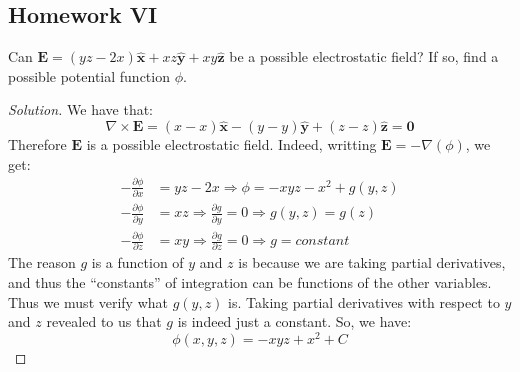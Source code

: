         \subsection{Homework VI}
            \begin{problem}[Wangsness 5-1]
                Can
                $\mathbf{E}%
                 =(yz-2x)\hat{\mathbf{x}}%
                 +xz\hat{\mathbf{y}}%
                 +xy\hat{\mathbf{z}}$
                be a possible electrostatic field? If so,
                find a possible potential function $\phi$.
            \end{problem}
            \begin{proof}[Solution]
                We have that:
                \begin{equation*}
                    \nabla\times\mathbf{E}
                    =(x-x)\hat{\mathbf{x}}
                    -(y-y)\hat{\mathbf{y}}
                    +(z-z)\hat{\mathbf{z}}
                    =\mathbf{0}    
                \end{equation*}
                Therefore $\mathbf{E}$ is a possible electrostatic field.
                Indeed, writting $\mathbf{E}=-\nabla(\phi)$, we get:
                \begin{align*}
                    -\frac{\partial\phi}{\partial{x}}
                    &=yz-2x
                    \Rightarrow\phi=-xyz-x^{2}+g(y,z)\\
                    -\frac{\partial\phi}{\partial{y}}
                    &=xz
                    \Rightarrow\frac{\partial{g}}{\partial{y}}=0
                    \Rightarrow{g(y,z)=g(z)}\\
                    -\frac{\partial\phi}{\partial{z}}
                    &=xy
                    \Rightarrow\frac{\partial{g}}{\partial{z}}=0
                    \Rightarrow{g=constant}
                \end{align*}
                The reason $g$ is a function of $y$ and $z$ is because
                we are taking partial derivatives, and thus the
                ``constants'' of integration can be functions of
                the other variables. Thus we must verify what $g(y,z)$
                is. Taking partial derivatives with respect to
                $y$ and $z$ revealed to us that $g$ is indeed just
                a constant. So, we have:
                \begin{equation*}
                    \phi(x,y,z)=-xyz+x^{2}+C    
                \end{equation*}

\end{proof}
